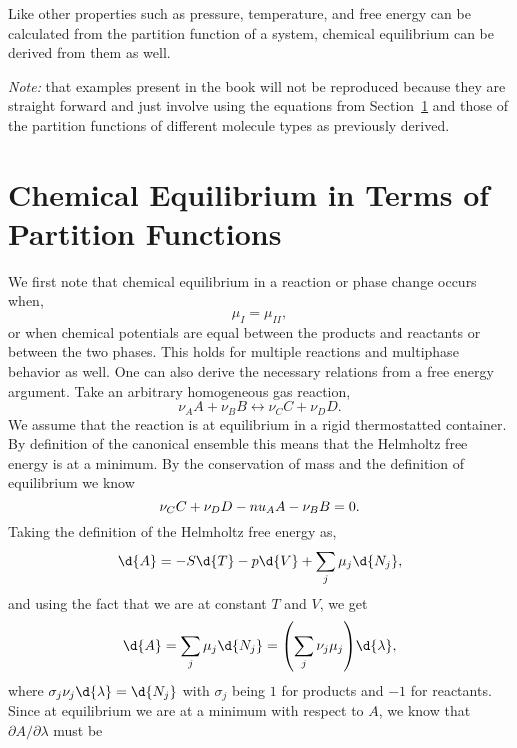 Like other properties such as pressure, temperature, and free energy can be
calculated from the partition function of a system, chemical equilibrium can be
derived from them as well.

\textit{Note: }that examples present in the book will not be reproduced because
they are straight forward and just involve using the equations from
Section~\ref{sec:chemeqetpf} and those of the partition functions of different
molecule types as previously derived.

\section{Chemical Equilibrium in Terms of Partition Functions}%
\label{sec:chemeqetpf}
We first note that chemical equilibrium in a reaction or phase change occurs
when,
\begin{equation*}
	\mu_I = \mu_{II},
\end{equation*}
or when chemical potentials are equal between the products and reactants or
between the two phases. This holds for multiple reactions and multiphase
behavior as well. One can also derive the necessary relations from a free energy
argument. Take an arbitrary homogeneous gas reaction,
\begin{equation*}
	\nu_A A + \nu_B B \leftrightarrow \nu_C C + \nu_D D.
\end{equation*}
We assume that the reaction is at equilibrium in a rigid thermostatted
container. By definition of the canonical ensemble this means that the Helmholtz
free energy is at a minimum. By the conservation of mass and the definition of
equilibrium we know
\begin{equation*}
	\nu_C C + \nu_D D - \\nu_A A - \nu_B B = 0.
\end{equation*}
Taking the definition of the Helmholtz free energy as,
\begin{equation*}
	\d{A} = -S\d{T} - p\d{V} + \sum_{j}{\mu_j \d{N_{j}}},
\end{equation*}
and using the fact that we are at constant $T$ and $V$, we get
\begin{equation*}
	\d{A} = \sum_{j}{\mu_j \d{N_{j}}} = {\left(\sum_{j}{\nu_j
	\mu_{j}}\right)}\d{\lambda},
\end{equation*}
where $\sigma_j \nu_j \d{\lambda} = \d{N_{j}}$ with $\sigma_j$ being $1$
for products and $-1$ for reactants. Since at equilibrium we are at a
minimum with respect to $A$, we know that $\partial A/ \partial \lambda$ must be

